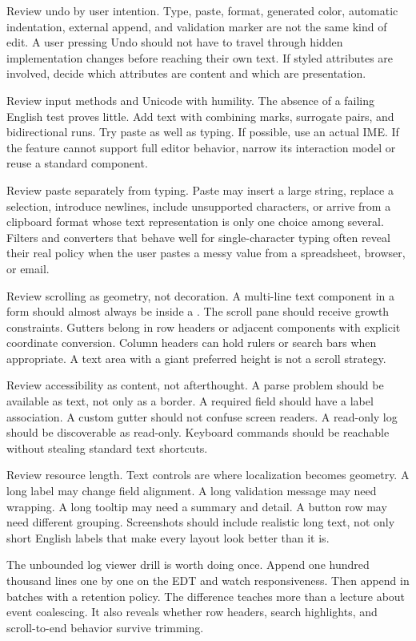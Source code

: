 Review undo by user intention. Type, paste, format, generated color, automatic indentation, external append, and validation marker are not the same kind of edit. A user pressing Undo should not have to travel through hidden implementation changes before reaching their own text. If styled attributes are involved, decide which attributes are content and which are presentation.

Review input methods and Unicode with humility. The absence of a failing English test proves little. Add text with combining marks, surrogate pairs, and bidirectional runs. Try paste as well as typing. If possible, use an actual IME. If the feature cannot support full editor behavior, narrow its interaction model or reuse a standard component.

Review paste separately from typing. Paste may insert a large string, replace a selection, introduce newlines, include unsupported characters, or arrive from a clipboard format whose text representation is only one choice among several. Filters and converters that behave well for single-character typing often reveal their real policy when the user pastes a messy value from a spreadsheet, browser, or email.

Review scrolling as geometry, not decoration. A multi-line text component in a form should almost always be inside a . The scroll pane should receive \miglayout{} growth constraints. Gutters belong in row headers or adjacent components with explicit coordinate conversion. Column headers can hold rulers or search bars when appropriate. A text area with a giant preferred height is not a scroll strategy.

Review accessibility as content, not afterthought. A parse problem should be available as text, not only as a border. A required field should have a label association. A custom gutter should not confuse screen readers. A read-only log should be discoverable as read-only. Keyboard commands should be reachable without stealing standard text shortcuts.

Review resource length. Text controls are where localization becomes geometry. A long label may change field alignment. A long validation message may need wrapping. A long tooltip may need a summary and detail. A button row may need different grouping. Screenshots should include realistic long text, not only short English labels that make every layout look better than it is.

The unbounded log viewer drill is worth doing once. Append one hundred thousand lines one by one on the EDT and watch responsiveness. Then append in batches with a retention policy. The difference teaches more than a lecture about event coalescing. It also reveals whether row headers, search highlights, and scroll-to-end behavior survive trimming.

